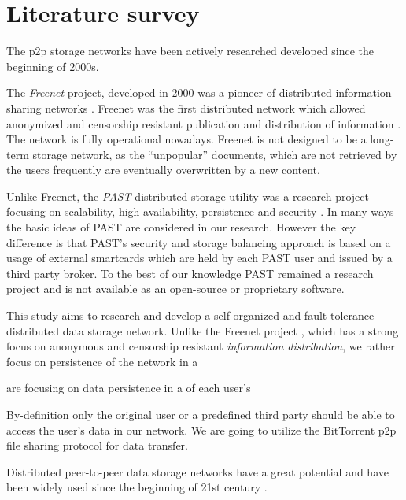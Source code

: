 \section{Literature survey}

The p2p storage networks have been actively researched developed since
the beginning of 2000s.

The \emph{Freenet} project, developed in 2000 was
a pioneer of distributed information sharing networks \cite{freenet}.
Freenet was the first distributed network which allowed anonymized
and censorship resistant publication and distribution of information
\cite{dark-freenet}. The network is fully operational nowadays.
Freenet is not designed to be a long-term storage network, as
the ``unpopular'' documents, which are not retrieved by the
users frequently are eventually overwritten by a new content.

Unlike Freenet, the \emph{PAST} distributed storage utility was a
research project focusing on scalability, high availability, persistence
and security \cite{past}. In many ways the basic ideas of PAST are
considered in our research. However the key difference is that PAST's
security and storage balancing approach is based on a usage of external
smartcards which are held by each PAST user and issued by a third
party broker. To the best of our knowledge PAST remained a research
project and is not available as an open-source or proprietary software.


This study aims to research and develop a self-organized and fault-tolerance
distributed data storage network. Unlike the Freenet project \cite{freenet},
which has a strong focus on anonymous and censorship resistant \emph{information
distribution}, we rather focus on persistence of the network in a

  are focusing on data persistence in a  of each user's

By-definition only the original user
or a predefined third party should be able to access the user's data
in our network. We are going to utilize the BitTorrent \cite{bittorrent-ma}
p2p file sharing protocol for data transfer.


Distributed peer-to-peer data storage networks have a great potential and have
been widely used since the beginning of 21st century
\cite{chord-01}.
